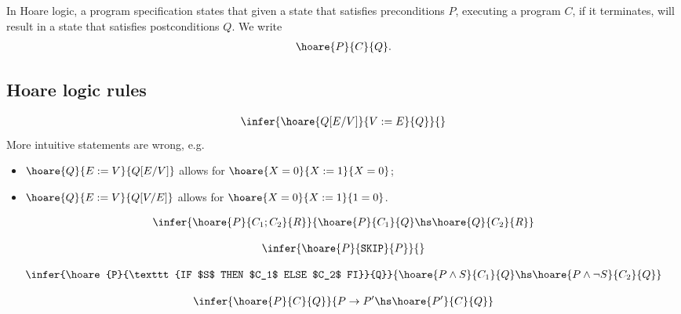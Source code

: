 \documentclass{article}
\begin{document}
\begin{definition}
	In Hoare logic, a program specification states that
	given a state that satisfies preconditions $P$, executing a program $C$, if it terminates,
	will result in a state that satisfies postconditions $Q$. We write
	\begin{align*}
		\hoare{P}{C}{Q}.
	\end{align*}
\end{definition}

\subsection{Hoare logic rules}

\begin{definition}
	\begin{align*}
		\infer{\hoare{Q[E/V]}{V:=E}{Q}}{}
	\end{align*}
	More intuitive statements are wrong, e.g.
	\begin{itemize}
		\item $\hoare{Q}{E:=V}{Q[E/V]}$ allows for $\hoare{X=0}{X:=1}{X=0}$;
		\item $\hoare{Q}{E:=V}{Q[V/E]}$ allows for $\hoare{X=0}{X := 1}{1 = 0}$.
	\end{itemize}
\end{definition}

\begin{definition}
	\begin{align*}
		\infer{\hoare{P}{C_1; C_2}{R}}{\hoare{P}{C_1}{Q} \hs \hoare{Q}{C_2}{R}}
	\end{align*}
\end{definition}

\begin{definition}
	\begin{align*}
		\infer{\hoare{P}{\texttt{SKIP}}{P}}{}
	\end{align*}
\end{definition}

\begin{definition}
	\begin{align*}
		\infer{\hoare{P}{\texttt{IF $S$ THEN $C_1$ ELSE $C_2$ FI}}{Q}}{
			\hoare{P\wedge S}{C_1}{Q}\hs\hoare{P\wedge\neg S}{C_2}{Q}
		}
	\end{align*}
\end{definition}

\begin{definition}
	\begin{align*}
		\infer{\hoare{P}{C}{Q}}{P\to P'\hs\hoare{P'}{C}{Q}}
	\end{align*}
\end{definition}
\end{document}
